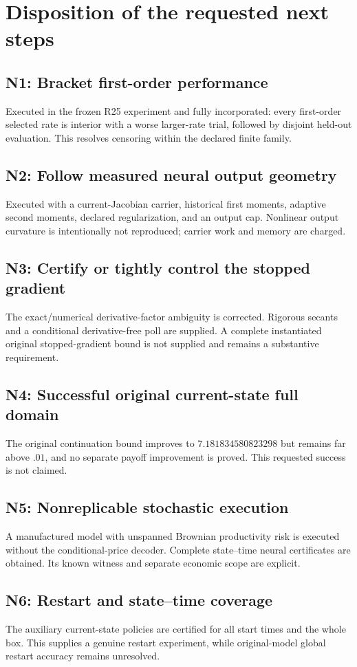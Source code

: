 \section{Disposition of the requested next steps}
\subsection{N1: Bracket first-order performance}
Executed in the frozen R25 experiment and fully incorporated: every first-order selected rate is interior with a worse larger-rate trial, followed by disjoint held-out evaluation. This resolves censoring within the declared finite family.
\subsection{N2: Follow measured neural output geometry}
Executed with a current-Jacobian carrier, historical first moments, adaptive second moments, declared regularization, and an output cap. Nonlinear output curvature is intentionally not reproduced; carrier work and memory are charged.
\subsection{N3: Certify or tightly control the stopped gradient}
The exact/numerical derivative-factor ambiguity is corrected. Rigorous secants and a conditional derivative-free poll are supplied. A complete instantiated original stopped-gradient bound is not supplied and remains a substantive requirement.
\subsection{N4: Successful original current-state full domain}
The original continuation bound improves to $7.181834580823298$ but remains far above $.01$, and no separate payoff improvement is proved. This requested success is not claimed.
\subsection{N5: Nonreplicable stochastic execution}
A manufactured model with unspanned Brownian productivity risk is executed without the conditional-price decoder. Complete state--time neural certificates are obtained. Its known witness and separate economic scope are explicit.
\subsection{N6: Restart and state--time coverage}
The auxiliary current-state policies are certified for all start times and the whole box. This supplies a genuine restart experiment, while original-model global restart accuracy remains unresolved.
